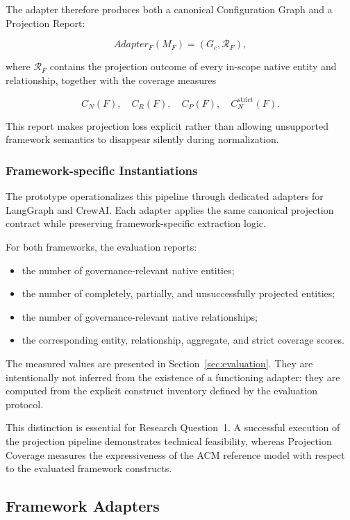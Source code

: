 \documentclass[10pt]{article}
\begin{document}
The adapter therefore produces both a canonical Configuration Graph and a
Projection Report:

\[
Adapter_F(M_F)
=
(G_c,\mathcal{R}_F),
\tag{50}
\]

where $\mathcal{R}_F$ contains the projection outcome of every in-scope native
entity and relationship, together with the coverage measures

\[
C_N(F),\quad
C_R(F),\quad
C_P(F),\quad
C_N^{\mathrm{strict}}(F).
\]

This report makes projection loss explicit rather than allowing unsupported
framework semantics to disappear silently during normalization.

\subsubsection{Framework-specific Instantiations}

The prototype operationalizes this pipeline through dedicated adapters for
LangGraph and CrewAI. Each adapter applies the same canonical projection
contract while preserving framework-specific extraction logic.

For both frameworks, the evaluation reports:

\begin{itemize}
    \item the number of governance-relevant native entities;
    \item the number of completely, partially, and unsuccessfully projected
    entities;
    \item the number of governance-relevant native relationships;
    \item the corresponding entity, relationship, aggregate, and strict
    coverage scores.
\end{itemize}

The measured values are presented in
Section~\ref{sec:evaluation}. They are intentionally not inferred from the
existence of a functioning adapter: they are computed from the explicit
construct inventory defined by the evaluation protocol.

This distinction is essential for Research Question~1. A successful execution
of the projection pipeline demonstrates technical feasibility, whereas
Projection Coverage measures the expressiveness of the ACM reference model with
respect to the evaluated framework constructs.

\subsection{Framework Adapters}
\label{sec:framework_adapters}
\end{document}
